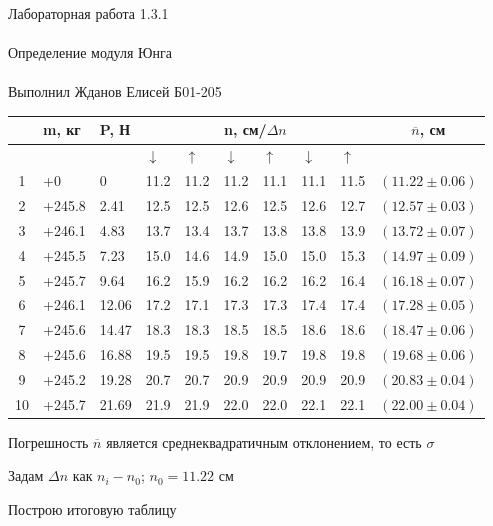 \documentclass{astroedu-lab}
\begin{document}
\begin{problem}{\huge Лабораторная работа 1.3.1\\\\Определение модуля Юнга\\\\Выполнил Жданов Елисей Б01-205}
\begin{center}
\begin{tabular}[t]{|c|l|l|l|l|l|l|l|l|c|}
\hline
& m, кг & P, Н & \multicolumn{6}{|c|}{n, см/$\Delta n$} & $\overline{n}$, см \\
\hline
&&& $\downarrow$ & $\uparrow$ & $\downarrow$ & $\uparrow$ & $\downarrow$ & $\uparrow$ & \\
\hline
1  & +0		& 0 	& 11.2 & 11.2 & 11.2 & 11.1 & 11.1 & 11.5 & $(11.22 \pm 0.06)$ \\
2  & +245.8 & 2.41  & 12.5 & 12.5 & 12.6 & 12.5 & 12.6 & 12.7 & $(12.57 \pm 0.03)$ \\
3  & +246.1 & 4.83  & 13.7 & 13.4 & 13.7 & 13.8 & 13.8 & 13.9 & $(13.72 \pm 0.07)$ \\
4  & +245.5 & 7.23  & 15.0 & 14.6 & 14.9 & 15.0 & 15.0 & 15.3 & $(14.97 \pm 0.09)$ \\
5  & +245.7 & 9.64  & 16.2 & 15.9 & 16.2 & 16.2 & 16.2 & 16.4 & $(16.18 \pm 0.07)$ \\
6  & +246.1 & 12.06 & 17.2 & 17.1 & 17.3 & 17.3 & 17.4 & 17.4 & $(17.28 \pm 0.05)$ \\
7  & +245.6 & 14.47 & 18.3 & 18.3 & 18.5 & 18.5 & 18.6 & 18.6 & $(18.47 \pm 0.06)$ \\
8  & +245.6 & 16.88 & 19.5 & 19.5 & 19.8 & 19.7 & 19.8 & 19.8 & $(19.68 \pm 0.06)$ \\
9 & +245.2  & 19.28 & 20.7 & 20.7 & 20.9 & 20.9 & 20.9 & 20.9 & $(20.83 \pm 0.04)$ \\
10 & +245.7 & 21.69 & 21.9 & 21.9 & 22.0 & 22.0 & 22.1 & 22.1 & $(22.00 \pm 0.04)$ \\
\hline
\end{tabular}
\end{center}

Погрешность $\overline{n}$ является среднеквадратичным отклонением, то есть $\sigma$

Задам $\Delta n$ как $n_i - n_0$; $n_0 = 11.22$ см

Построю итоговую таблицу


\end{problem}
\end{document}
